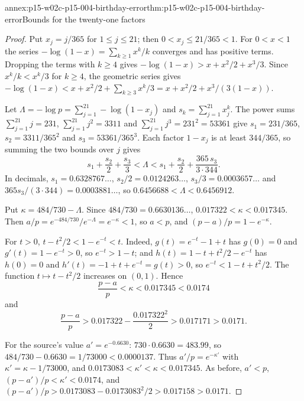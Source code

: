 \begin{annexitem}{annex:p15-w02c-p15-004-birthday-error}{thm:p15-w02c-p15-004-birthday-error}{Bounds for the twenty-one factors}
\begin{proof}
Put \(x_j=j/365\) for \(1\leq j\leq21\); then \(0<x_j\leq21/365<1\).
For \(0<x<1\) the series \(-\log(1-x)=\sum_{k\geq1}x^k/k\) converges
and has positive terms. Dropping the terms with \(k\geq4\) gives
\(-\log(1-x)>x+x^2/2+x^3/3\). Since \(x^k/k<x^k/3\) for \(k\geq4\),
the geometric series gives
\(-\log(1-x)<x+x^2/2+\sum_{k\geq3}x^k/3=x+x^2/2+x^3/(3(1-x))\).

Let \(\Lambda=-\log p=\sum_{j=1}^{21}-\log(1-x_j)\) and
\(s_k=\sum_{j=1}^{21}x_j^k\). The power sums
\(\sum_{j=1}^{21}j=231\), \(\sum_{j=1}^{21}j^2=3311\) and
\(\sum_{j=1}^{21}j^3=231^2=53361\) give
\(s_1=231/365\), \(s_2=3311/365^2\) and \(s_3=53361/365^3\). Each
factor \(1-x_j\) is at least \(344/365\), so summing the two bounds
over \(j\) gives
\[
 s_1+\frac{s_2}2+\frac{s_3}3<\Lambda
   <s_1+\frac{s_2}2+\frac{365\,s_3}{3\cdot344}.
\]
In decimals, \(s_1=0.6328767\ldots\), \(s_2/2=0.0124263\ldots\),
\(s_3/3=0.0003657\ldots\) and \(365s_3/(3\cdot344)=0.0003881\ldots\),
so \(0.6456688<\Lambda<0.6456912\).

Put \(\kappa=484/730-\Lambda\). Since \(484/730=0.6630136\ldots\),
\(0.017322<\kappa<0.017345\). Then
\(a/p=e^{-484/730}/e^{-\Lambda}=e^{-\kappa}<1\), so \(a<p\), and
\((p-a)/p=1-e^{-\kappa}\).

For \(t>0\), \(t-t^2/2<1-e^{-t}<t\). Indeed, \(g(t)=e^{-t}-1+t\) has
\(g(0)=0\) and \(g'(t)=1-e^{-t}>0\), so \(e^{-t}>1-t\); and
\(h(t)=1-t+t^2/2-e^{-t}\) has \(h(0)=0\) and
\(h'(t)=-1+t+e^{-t}=g(t)>0\), so \(e^{-t}<1-t+t^2/2\). The function
\(t\mapsto t-t^2/2\) increases on \((0,1)\). Hence
\[
 \frac{p-a}p<\kappa<0.017345<0.0174
\]
and
\[
 \frac{p-a}p>0.017322-\frac{0.017322^2}2>0.017171>0.0171.
\]

For the source's value \(a'=e^{-0.6630}\): \(730\cdot0.6630=483.99\),
so \(484/730-0.6630=1/73000<0.0000137\). Thus
\(a'/p=e^{-\kappa'}\) with \(\kappa'=\kappa-1/73000\), and
\(0.0173083<\kappa'<\kappa<0.017345\). As before, \(a'<p\),
\((p-a')/p<\kappa'<0.0174\), and
\((p-a')/p>0.0173083-0.0173083^2/2>0.017158>0.0171\).
\end{proof}
\end{annexitem}

